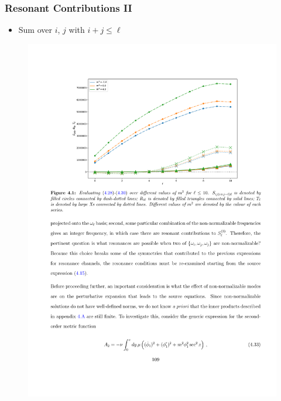 \documentclass[mathserif,10pt]{beamer}
\newcommand{\bi}{\begin{itemize}}
\newcommand{\ei}{\end{itemize}}
\newcommand{\its}{\item}
\begin{document}
{\frame
{
   \frametitle{Resonant Contributions II} 
   \bi
   \its Sum over $i$, $j$ with $i + j \leq \ell$
   \ei
   \begin{figure}
   \centering
    \includegraphics[scale=0.75]{norm} 
    \end{figure}
}
   


}
\end{document}

